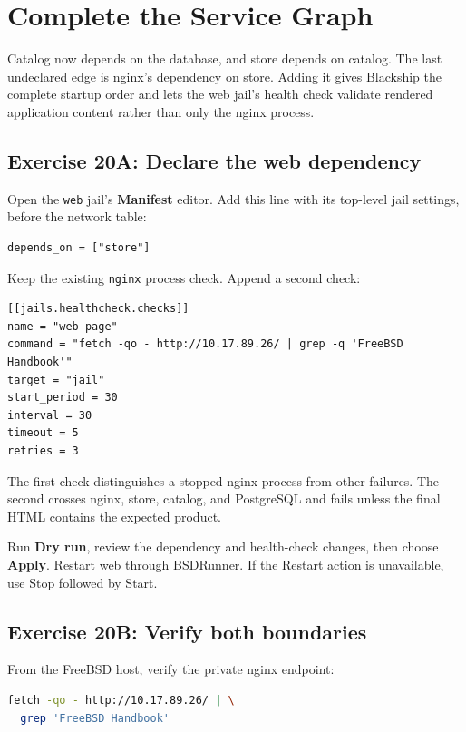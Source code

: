 \chapter{Complete the Service Graph}

Catalog now depends on the database, and store depends on catalog. The last
undeclared edge is nginx's dependency on store. Adding it gives Blackship the
complete startup order and lets the web jail's health check validate rendered
application content rather than only the nginx process.

\section{Exercise 20A: Declare the web dependency}

Open the \texttt{web} jail's \textbf{Manifest} editor. Add this line with its
top-level jail settings, before the network table:

\begin{lstlisting}
depends_on = ["store"]
\end{lstlisting}

Keep the existing \texttt{nginx} process check. Append a second check:

\begin{lstlisting}
[[jails.healthcheck.checks]]
name = "web-page"
command = "fetch -qo - http://10.17.89.26/ | grep -q 'FreeBSD Handbook'"
target = "jail"
start_period = 30
interval = 30
timeout = 5
retries = 3
\end{lstlisting}

The first check distinguishes a stopped nginx process from other failures. The
second crosses nginx, store, catalog, and PostgreSQL and fails unless the final
HTML contains the expected product.

Run \textbf{Dry run}, review the dependency and health-check changes, then
choose \textbf{Apply}. Restart web through BSDRunner. If the Restart action is
unavailable, use Stop followed by Start.

\section{Exercise 20B: Verify both boundaries}

From the FreeBSD host, verify the private nginx endpoint:

\begin{lstlisting}[language=sh]
fetch -qo - http://10.17.89.26/ | \
  grep 'FreeBSD Handbook'
\end{lstlisting}

